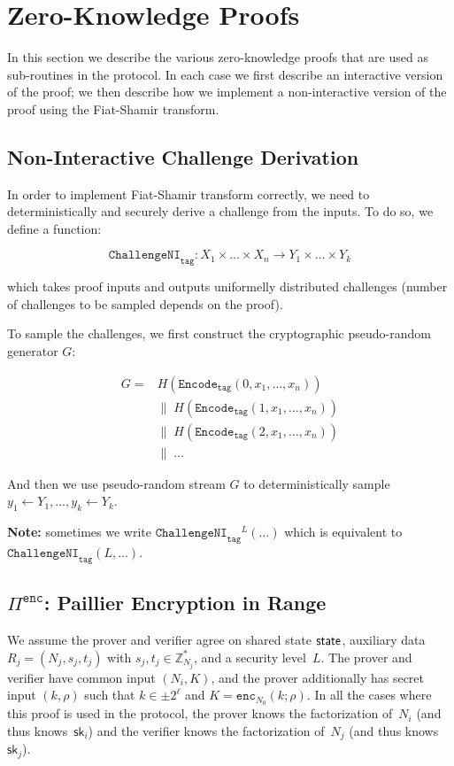 \documentclass[11pt]{article}
\def\state{{\sf state}}
\newcommand{\enc}{\ensuremath{\mathtt{enc}}}
\newcommand{\proof}[1]{\ensuremath{\Pi^{\mathtt{#1}}}}
\newcommand{\challengeni}[1]{\ensuremath{\mathtt{ChallengeNI}_{\mathtt{#1}}}}
\newcommand{\Encode}[1]{\ensuremath{\mathtt{Encode}_{\mathtt{#1}}}}
\newcommand{\sk}{\textsf{sk}}
\newcommand{\Z}{\mathbb{Z}}
\newcommand{\?}[1]{\stackrel{?}{#1}}
\begin{document}
\section{Zero-Knowledge Proofs}
In this section we describe the various zero-knowledge proofs that are used as sub-routines in the protocol. In each case we first describe an interactive version of the proof; we then describe how we implement a non-interactive version of the proof using the Fiat-Shamir transform.

\subsection{Non-Interactive Challenge Derivation}
In order to implement Fiat-Shamir transform correctly, we need to deterministically and securely derive a challenge
from the inputs. To do so, we define a function:

$$\challengeni{tag} : X_1 \times \dots \times X_n \to Y_1 \times \dots \times Y_k$$

which takes proof inputs and outputs uniformelly distributed challenges (number of challenges to be
sampled depends on the proof).

To sample the challenges, we first construct the cryptographic pseudo-random generator $G$:

\begin{align*}
G = & H(\Encode{tag}(0, x_1, \dots, x_n)) \\
    & \| \; H(\Encode{tag}(1, x_1, \dots, x_n)) \\
    & \| \; H(\Encode{tag}(2, x_1, \dots, x_n)) \\
    & \| \; \dots
\end{align*}

And then we use pseudo-random stream $G$ to deterministically sample $y_1 \gets Y_1, \dots, y_k \gets Y_k$.

{\bf Note:} sometimes we write $\challengeni{tag}^L(\dots)$ which is equivalent to $\challengeni{tag}(L, \dots)$.

\subsection{$\proof{enc}$: Paillier Encryption in Range}

We assume the prover and verifier agree on shared state $\state$, auxiliary data $R_j = (N_j, s_j, t_j)$ with $s_j, t_j \in \Z^*_{N_j}$, and a security level~$L$. 
The prover and verifier have common input $(N_i, K)$, and the prover additionally has 
secret input $(k, \rho)$ such that $k \in \pm 2^\ell$ and $K = \enc_{N_0}(k; \rho)$.
In all the cases where this proof is used in the protocol, the prover knows the factorization of~$N_i$ (and thus knows~$\sk_i$) and the verifier knows the factorization of~$N_j$ (and thus knows $\sk_j$).
\end{document}
